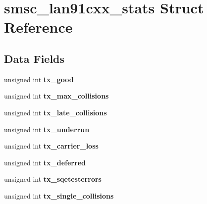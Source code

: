 \hypertarget{structsmsc__lan91cxx__stats}{}\section{smsc\+\_\+lan91cxx\+\_\+stats Struct Reference}
\label{structsmsc__lan91cxx__stats}
\subsection*{Data Fields}
\begin{DoxyCompactItemize}
\item 
\mbox{\label{structsmsc__lan91cxx__stats_af76f3482527f495433a77e1d115c9322}} 
unsigned int {\bfseries tx\+\_\+good}
\item 
\mbox{\label{structsmsc__lan91cxx__stats_a26d51cbee794dba512e11666d7058170}} 
unsigned int {\bfseries tx\+\_\+max\+\_\+collisions}
\item 
\mbox{\label{structsmsc__lan91cxx__stats_a4a76069d45f587310e384edbac716cbe}} 
unsigned int {\bfseries tx\+\_\+late\+\_\+collisions}
\item 
\mbox{\label{structsmsc__lan91cxx__stats_a9faff648b7c70e86ffe120f079607168}} 
unsigned int {\bfseries tx\+\_\+underrun}
\item 
\mbox{\label{structsmsc__lan91cxx__stats_a66dee8cfa2fe898f381744cb5123547e}} 
unsigned int {\bfseries tx\+\_\+carrier\+\_\+loss}
\item 
\mbox{\label{structsmsc__lan91cxx__stats_a9c5234da940765b2e508e130ab8ca428}} 
unsigned int {\bfseries tx\+\_\+deferred}
\item 
\mbox{\label{structsmsc__lan91cxx__stats_a781e61f065f9796f34e4df90d3b4155d}} 
unsigned int {\bfseries tx\+\_\+sqetesterrors}
\item 
\mbox{\label{structsmsc__lan91cxx__stats_affaf2bebbc6e3e1d542e386da56e2b4a}} 
unsigned int {\bfseries tx\+\_\+single\+\_\+collisions}
\item 

\end{DoxyCompactItemize}
